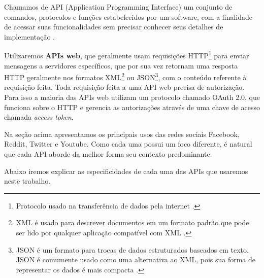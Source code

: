 Chamamos de API (Application Programming Interface) um conjunto de comandos, protocolos e funções estabelecidos por um software, com a finalidade de acessar suas funcionalidades sem precisar conhecer seus detalhes de implementação \cite{APIDef}.

Utilizaremos \textbf{APIs web}, que geralmente usam requisições HTTP\footnote{Protocolo usado na transferência de dados pela internet \cite{HTTPDef}.} para enviar mensagens a servidores específicos, que por sua vez retornam uma resposta HTTP geralmente nos formatos XML\footnote{XML é usado para descrever documentos em um formato padrão que pode ser lido por qualquer aplicação compatível com XML \cite{XMLDef}.} ou JSON\footnote{JSON é um formato para trocas de dados estruturados baseados em texto. JSON é comumente usado como uma alternativa ao XML, pois sua forma de representar os dados é mais compacta \cite{JSONDef}.}, com o conteúdo referente à requisição feita.
Toda requisição feita a uma API web precisa de autorização. Para isso a maioria das APIs web utilizam um protocolo chamado OAuth 2.0, que funciona sobre o HTTP e gerencia as autorizações através de uma chave de acesso chamada \textit{access token}.

Na seção acima apresentamos os principais usos das redes sociais Facebook, Reddit, Twitter e Youtube. Como cada uma possui um foco diferente, é natural que cada API aborde da melhor forma seu contexto predominante.

Abaixo iremos explicar as especificidades de cada uma das APIs que usaremos neste trabalho.

 


